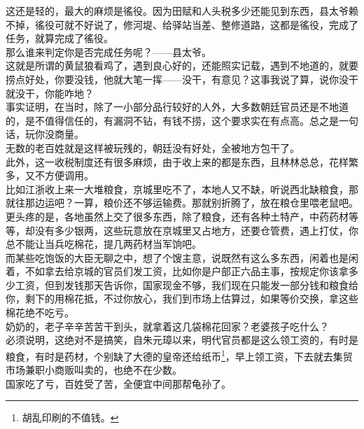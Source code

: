 \begin{multicols}{\theparacolNo}
这还是轻的，最大的麻烦是徭役。因为田赋和人头税多少还能见到东西，县太爷赖不掉，徭役可就不好说了，修河堤、给驿站当差、整修道路，这都是徭役，完成了任务，就算完成了徭役。\\

那么谁来判定你是否完成任务呢？——县太爷。\\

这就是所谓的黄鼠狼看鸡了，遇到良心好的，还能照实记载，遇到不地道的，就要捞点好处，你要没钱，他就大笔一挥——没干，有意见？这事我说了算，说你没干就没干，你能咋地？\\

事实证明，在当时，除了一小部分品行较好的人外，大多数朝廷官员还是不地道的，是不值得信任的，有漏洞不钻，有钱不捞，这个要求实在有点高。总之是一句话，玩你没商量。\\

无数的老百姓就是这样被玩残的，朝廷没有好处，全被地方包干了。\\

此外，这一收税制度还有很多麻烦，由于收上来的都是东西，且林林总总，花样繁多，又不方便调用。\\

比如江浙收上来一大堆粮食，京城里吃不了，本地人又不缺，听说西北缺粮食，那就往那边运吧？一算，粮价还不够运输费。那就别折腾了，放在粮仓里喂老鼠吧。\\

更头疼的是，各地虽然上交了很多东西，除了粮食，还有各种土特产，中药药材等等，却没有多少银两，这些玩意放在京城里又占地方，还要仓管费，遇上打仗，你总不能让当兵吃棉花，提几两药材当军饷吧。\\

而某些吃饱饭的大臣无聊之中，想了个馊主意，说既然有这么多东西，闲着也是闲着，不如拿去给京城的官员们发工资，比如你是户部正六品主事，按规定你该拿多少工资，但到发钱那天告诉你，国家现金不够，我们现在只能发一部分钱和粮食给你，剩下的用棉花抵，不过你放心，我们到市场上估算过，如果等价交换，拿这些棉花绝不吃亏。\\

奶奶的，老子辛辛苦苦干到头，就拿着这几袋棉花回家？老婆孩子吃什么？\\

必须说明，这绝对不是搞笑，自朱元璋以来，明代官员都是这么领工资的，有时是粮食，有时是药材，个别缺了大德的皇帝还给纸币\footnote{胡乱印刷的不值钱。}，早上领工资，下去就去集贸市场兼职小商贩叫卖的，也绝不在少数。\\

国家吃了亏，百姓受了苦，全便宜中间那帮龟孙了。\\


\end{multicols}
